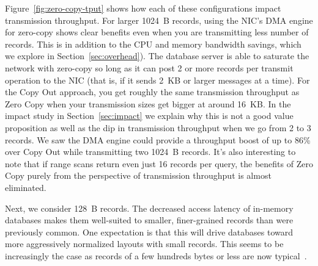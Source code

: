 Figure~\ref{fig:zero-copy-tput} shows how each of these configurations impact
transmission throughput. For larger 1024~B records, using the NIC's DMA engine
for zero-copy shows clear benefits even when you are transmitting less number of 
records. This is in addition to the CPU and memory bandwidth savings, which 
we explore in Section~\ref{sec:overhead}). The database server is able
to saturate the network with zero-copy so long as it can post 2 or more
records per transmit operation to the NIC (that is, if it sends 2~KB or larger
messages at a time). For the Copy Out approach, you get roughly the same transmission 
throughput as Zero Copy when your transmission sizes get bigger at around 16~KB. In 
the impact study in Section~\ref{sec:impact} we explain why this is not a good value 
proposition as well as the dip in transmission throughput when we go from 2 to 3 records.
We saw the DMA engine could provide a throughput boost
of up to 86\% over Copy Out while transmitting two 1024~B records. It's also interesting to note that if range scans return even just 16 records per query, the
benefits of Zero Copy purely from the perspective of transmission throughput is almost eliminated.



Next, we consider 128~B records. The decreased access latency of
in-memory databases makes them well-suited to smaller, finer-grained records
than were previously common. One expectation is that this will drive databases
toward more aggressively normalized layouts with small records. This
seems to be increasingly the case as records of a few hundreds bytes or less
are now typical~\cite{fb-memcache,fb-workload,inmemoryworkload}.

